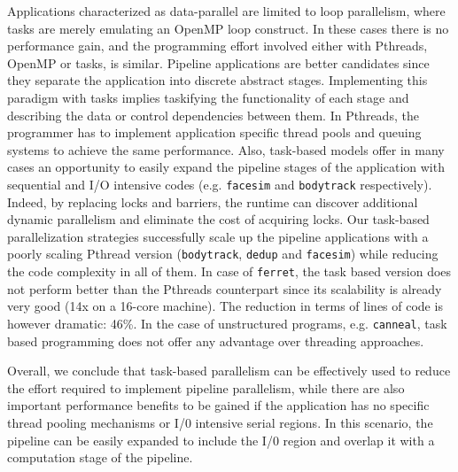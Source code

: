 Applications characterized as data-parallel are limited to loop parallelism, where tasks are merely emulating an OpenMP loop construct.
In these cases there is no performance gain, and the programming effort involved either with Pthreads, OpenMP or tasks, is similar. 
Pipeline
applications are better candidates since they separate the application into discrete abstract stages. 
Implementing this paradigm with
tasks implies taskifying the functionality of each stage and describing the data or control dependencies between them. 
In Pthreads, the
programmer has to implement application specific thread pools and queuing systems to achieve the same performance.
Also, task-based models offer in many cases an opportunity to easily
expand the pipeline stages of the application with sequential and I/O intensive codes (e.g. \texttt{facesim} and \texttt{bodytrack} respectively). 
Indeed, by replacing locks and
barriers, the runtime can discover additional dynamic parallelism and eliminate the cost of acquiring locks. 
Our task-based parallelization strategies successfully scale up the pipeline applications with a poorly scaling Pthread version (\texttt{bodytrack}, \texttt{dedup} and \texttt{facesim}) while
reducing the code complexity in all of them.
In case of \texttt{ferret}, the task based version does not perform better than the Pthreads counterpart since its scalability is already very good (14x on a 16-core machine). 
The reduction in terms of lines of code is however dramatic: 46\%.
In the case of
unstructured programs,  e.g. \texttt{canneal}, task based programming does not offer any advantage over threading approaches.  

Overall, we conclude that task-based parallelism can be
effectively used to reduce the effort required to implement pipeline parallelism, while there are also important performance benefits to
be gained if the application has no specific thread pooling mechanisms or I/0 intensive serial regions.
In this scenario, the pipeline can be easily expanded to include the I/0 region and overlap it with a
computation stage of the pipeline.

